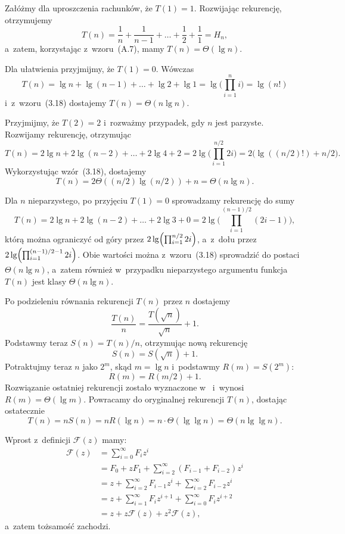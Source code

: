 \subproblem %
Załóżmy dla uproszczenia rachunków, że $T(1)=1$. Rozwijając rekurencję, otrzymujemy
\[
	T(n) = \frac{1}{n}+\frac{1}{n-1}+\dots+\frac{1}{2}+\frac{1}{1} = H_n,
\]
a~zatem, korzystając z~wzoru~(A.7), mamy $T(n)=\Theta(\lg n)$.

\subproblem %
Dla ułatwienia przyjmijmy, że $T(1)=0$. Wówczas
\[
	T(n) = \lg n+\lg(n-1)+\dots+\lg2+\lg1 = \lg\biggl(\prod_{i=1}^ni\biggr) = \lg(n!)
\]
i~z~wzoru~(3.18) dostajemy $T(n)=\Theta(n\lg n)$.

\subproblem %
Przyjmijmy, że $T(2)=2$ i~rozważmy przypadek, gdy $n$ jest parzyste. Rozwijamy rekurencję, otrzymując
\[
	T(n) = 2\lg n+2\lg(n-2)+\dots+2\lg4+2 = 2\lg\biggl(\prod_{i=1}^{n/2}2i\biggr) = 2\bigl(\lg((n/2)!)+n/2\bigr).
\]
Wykorzystując wzór~(3.18), dostajemy
\[
	T(n) = 2\Theta((n/2)\lg (n/2))+n = \Theta(n\lg n).
\]

Dla $n$ nieparzystego, po przyjęciu $T(1)=0$ sprowadzamy rekurencję do sumy
\[
	T(n) = 2\lg n+2\lg(n-2)+\dots+2\lg3+0 = 2\lg\biggl(\prod_{i=1}^{(n-1)/2}(2i-1)\biggr),
\]
którą można ograniczyć od góry przez $2\lg\Bigl(\prod_{i=1}^{n/2}2i\Bigr)$, a~z~dołu przez $2\lg\Bigl(\prod_{i=1}^{(n-1)/2-1}2i\Bigr)$. Obie wartości można z~wzoru~(3.18) sprowadzić do postaci $\Theta(n\lg n)$, a~zatem również w~przypadku nieparzystego argumentu funkcja $T(n)$ jest klasy $\Theta(n\lg n)$.

\subproblem %
Po podzieleniu równania rekurencji $T(n)$ przez $n$ dostajemy
\[
	\frac{T(n)}{n} = \frac{T(\!\sqrt{n})}{\sqrt{n}}+1.
\]
Podstawmy teraz $S(n)=T(n)/n$, otrzymując nową rekurencję
\[
	S(n) = S(\!\sqrt{n})+1.
\]
Potraktujmy teraz $n$ jako $2^m$, skąd $m=\lg n$ i~podstawmy $R(m)=S(2^m)$:
\[
	R(m) = R(m/2)+1.
\]
Rozwiązanie ostatniej rekurencji zostało wyznaczone w~ i~wynosi $R(m)=\Theta(\lg m)$. Powracamy do oryginalnej rekurencji $T(n)$, dostając ostatecznie
\[
	T(n) = nS(n) = nR(\lg n) = n\cdot\Theta(\lg\lg n) = \Theta(n\lg\lg n).
\]


\subproblem %
Wprost z~definicji $\mathcal{F}(z)$ mamy:
\begin{align*}
	\mathcal{F}(z) &= \sum_{i=0}^\infty F_iz^i \\
	&= F_0+zF_1+\sum_{i=2}^\infty (F_{i-1}+F_{i-2})z^i \\
	&= z+\sum_{i=2}^\infty F_{i-1}z^i+\sum_{i=2}^\infty F_{i-2}z^i \\
	&= z+\sum_{i=1}^\infty F_iz^{i+1}+\sum_{i=0}^\infty F_iz^{i+2} \\[2mm]
	&= z+z\mathcal{F}(z)+z^2\mathcal{F}(z),
\end{align*}
a~zatem tożsamość zachodzi.

